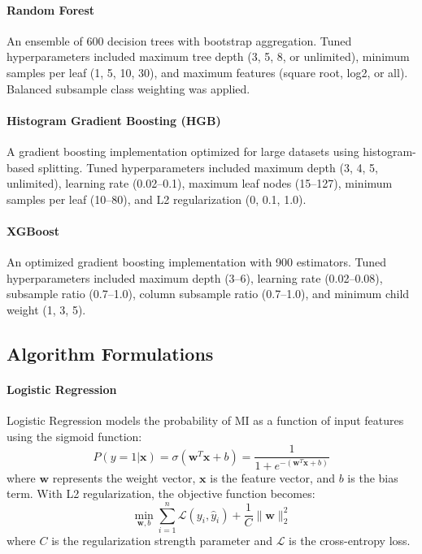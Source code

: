 \documentclass[fleqn,10pt,lineno]{wlpeerj}
\begin{document}
\paragraph{Random Forest}
An ensemble of 600 decision trees with bootstrap aggregation. Tuned hyperparameters included maximum tree depth (3, 5, 8, or unlimited), minimum samples per leaf (1, 5, 10, 30), and maximum features (square root, log2, or all). Balanced subsample class weighting was applied.

\paragraph{Histogram Gradient Boosting (HGB)}
A gradient boosting implementation optimized for large datasets using histogram-based splitting. Tuned hyperparameters included maximum depth (3, 4, 5, unlimited), learning rate (0.02--0.1), maximum leaf nodes (15--127), minimum samples per leaf (10--80), and L2 regularization (0, 0.1, 1.0).

\paragraph{XGBoost}
An optimized gradient boosting implementation with 900 estimators. Tuned hyperparameters included maximum depth (3--6), learning rate (0.02--0.08), subsample ratio (0.7--1.0), column subsample ratio (0.7--1.0), and minimum child weight (1, 3, 5).

\subsection*{Algorithm Formulations}

\paragraph{Logistic Regression}
Logistic Regression models the probability of MI as a function of input features using the sigmoid function:
\begin{equation}
P(y=1|\mathbf{x}) = \sigma(\mathbf{w}^T\mathbf{x} + b) = \frac{1}{1 + e^{-(\mathbf{w}^T\mathbf{x} + b)}}
\label{eq:logreg}
\end{equation}
where $\mathbf{w}$ represents the weight vector, $\mathbf{x}$ is the feature vector, and $b$ is the bias term. With L2 regularization, the objective function becomes:
\begin{equation}
\min_{\mathbf{w},b} \sum_{i=1}^{n} \mathcal{L}(y_i, \hat{y}_i) + \frac{1}{C}\|\mathbf{w}\|_2^2
\label{eq:logreg_obj}
\end{equation}
where $C$ is the regularization strength parameter and $\mathcal{L}$ is the cross-entropy loss.
\end{document}
